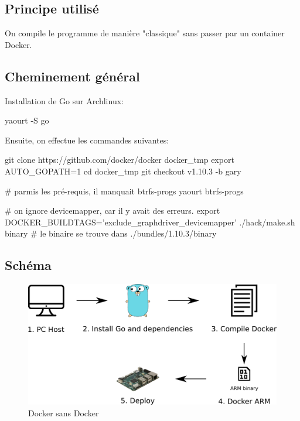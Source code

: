 \documentclass[11pt,a4paper,oneside]{report}
\begin{document}
\subsection{Principe utilisé}

On compile le programme de manière "classique" sans passer par un container Docker.

\subsection{Cheminement général}

Installation de Go sur Archlinux:

\begin{bashcode}
yaourt -S go
\end{bashcode}

Ensuite, on effectue les commandes suivantes:

\begin{bashcode}
git clone https://github.com/docker/docker docker_tmp
export AUTO_GOPATH=1
cd docker_tmp
git checkout v1.10.3 -b gary

# parmis les pré-requis, il manquait btrfs-progs
yaourt btrfs-progs

# on ignore devicemapper, car il y avait des erreurs.
export DOCKER_BUILDTAGS='exclude_graphdriver_devicemapper'
./hack/make.sh binary
# le binaire se trouve dans ./bundles/1.10.3/binary
\end{bashcode}

\subsection{Schéma}

\begin{figure}
    \begin{center}
        \includegraphics[scale=0.6]{img/docker_without_docker}
    \end{center}
    \caption{Docker sans Docker}
    \label{fig_docker_without_docker}
\end{figure}
\end{document}
